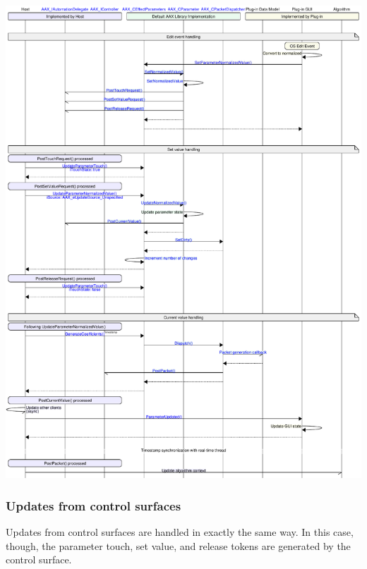 \begin{DoxyImage}
\includegraphics[width=\textwidth,height=\textheight/2,keepaspectratio=true]{msc_AAX_ParameterUpdate_GUI}
\caption{Detailed sequence of method calls and events for a parameter update following a user-\/generated edit on the plug-\/in G\+U\+I}
\end{DoxyImage}
 \hypertarget{a00353_parameterUpdates_sequences_user_controlsurface}{}\subsubsection{Updates from control surfaces}\label{a00353_parameterUpdates_sequences_user_controlsurface}
Updates from control surfaces are handled in exactly the same way. In this case, though, the parameter touch, set value, and release tokens are generated by the control surface.


